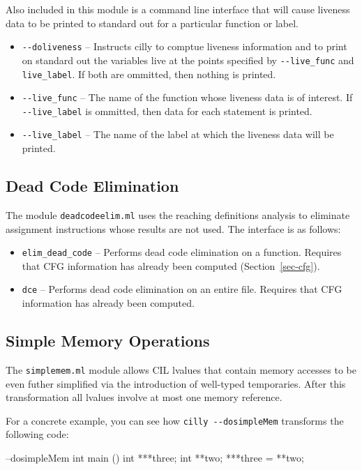 \documentclass[letterpaper]{article}
\def\secref#1{Section~\ref{sec-#1}}
\def\t#1{{\tt #1}}
\begin{document}
Also included in this module is a command line interface that
will cause liveness data to be printed to standard out for
a particular function or label.

\begin{itemize}
\item \t{-{}-doliveness} -- Instructs cilly to comptue liveness
information and to print on standard out the variables live
at the points specified by \t{-{}-live\_func} and \t{live\_label}.
If both are ommitted, then nothing is printed.
\item \t{-{}-live\_func} -- The name of the function whose
liveness data is of interest. If \t{-{}-live\_label} is ommitted,
then data for each statement is printed.
\item \t{-{}-live\_label} -- The name of the label at which
the liveness data will be printed.
\end{itemize}

\subsection{Dead Code Elimination}

The module \t{deadcodeelim.ml} uses the reaching definitions
analysis to eliminate assignment instructions whose results
are not used. The interface is as follows:

\begin{itemize}
\item \t{elim\_dead\_code} -- Performs dead code elimination
on a function. Requires that CFG information has already
been computed (\secref{cfg}).
\item \t{dce} -- Performs dead code elimination on an
entire file. Requires that CFG information has already
been computed.
\end{itemize}

\subsection{Simple Memory Operations} 

The \t{simplemem.ml} module allows CIL lvalues that contain memory
accesses to be even futher simplified via the introduction of
well-typed temporaries. After this transformation all lvalues involve
at most one memory reference.

For a concrete example, you can see how \t{cilly -{}-dosimpleMem} 
transforms the following code:

\begin{cilcode}[global] --dosimpleMem
  int main () {
    int ***three;
    int **two;
    ***three = **two; 
  } 
\end{cilcode}
\end{document}
